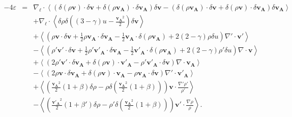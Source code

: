 \begin{equation}
\boxed{
\begin{array}{lcl}
\label{eq:turb_elpol_f2}-4\varepsilon &=& \nabla_{\boldsymbol{\ell}} \cdot \left<\left(\delta \left(\rho\boldsymbol{v}\right) \cdot \delta \boldsymbol{v}+ \delta \left(\rho\boldsymbol{v_A}\right) \cdot \delta \boldsymbol{v_A}\right) \delta \boldsymbol{v}  -\left(\delta \left(\rho\boldsymbol{v_A}\right) \cdot \delta \boldsymbol{v}  + \delta \left(\rho\boldsymbol{v}\right) \cdot \delta \boldsymbol{v_A}  \right) \delta \boldsymbol{v_A} \right>\\
&& + \nabla_{\boldsymbol{\ell}} \cdot \left<\delta \rho  \delta \left(\left(3-\gamma\right)u - \frac{\boldsymbol{v_A}^2}{2}\right)\delta \boldsymbol{v}\right> \\
&& +\left< \left(\rho \boldsymbol{v} \cdot \delta \boldsymbol{v} +\frac{1}{2} \rho \boldsymbol{v_A} \cdot \delta \boldsymbol{v_A} -\frac{1}{2} \boldsymbol{v_A} \cdot \delta \left(\rho \boldsymbol{v_A}\right) + 2 \left(2-\gamma\right)\rho \delta u \right) \nabla' \cdot \boldsymbol{v'} \right>\\
&& -\left< \left(\rho' \boldsymbol{v'} \cdot \delta \boldsymbol{v} +\frac{1}{2} \rho' \boldsymbol{v'_A} \cdot \delta \boldsymbol{v_A} -\frac{1}{2} \boldsymbol{v'_A} \cdot \delta \left(\rho \boldsymbol{v_A}\right) + 2\left(2-\gamma\right)\rho' \delta u   \right)\nabla \cdot \boldsymbol{v}\right>\\
&&+ \left<\left(2 \rho' \boldsymbol{v'} \cdot \delta \boldsymbol{v_A}+ \delta\left(\rho \boldsymbol{v}\right) \cdot \boldsymbol{v'_A} - \rho' \boldsymbol{v'_A} \cdot \delta \boldsymbol{v}  \right)\nabla \cdot \boldsymbol{v_A}\right>\\
&&- \left<\left(2\rho \boldsymbol{v} \cdot \delta \boldsymbol{v_A} + \delta\left(\rho \boldsymbol{v}\right) \cdot \boldsymbol{v_A} - \rho \boldsymbol{v_A} \cdot \delta \boldsymbol{v}  \right)\nabla' \cdot \boldsymbol{v'_A}\right> \\
&&+  \left< \left(\frac{\boldsymbol{v_A}^2}{2} \left(1+\beta\right) \delta \rho - \rho \delta \left(\frac{\boldsymbol{v_A}^2}{2} \left(1+\beta\right)\right)  \right)\boldsymbol{v} \cdot \frac{\nabla' \rho'}{\rho'}\right>\\
&&- \left<\left(\frac{\boldsymbol{v'_A}^2}{2} \left(1+\beta'\right) \delta \rho - \rho' \delta \left(\frac{\boldsymbol{v_A}^2}{2} \left(1+\beta\right)\right)  \right)  \boldsymbol{v'} \cdot \frac{\nabla \rho}{\rho} \right> .
\end{array}}
\end{equation} 

